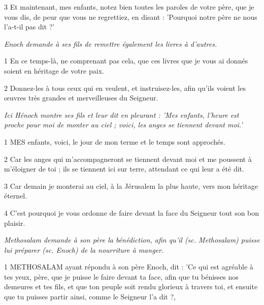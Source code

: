 \par 3 Et maintenant, mes enfants, notez bien toutes les paroles de votre père, que je vous dis, de peur que vous ne regrettiez, en disant : 'Pourquoi notre père ne nous l'a-t-il pas dit ?'


\par \textit{Enoch demande à ses fils de remettre également les livres à d'autres.}

\par 1 En ce temps-là, ne comprenant pas cela, que ces livres que je vous ai donnés soient en héritage de votre paix.

\par 2 Donnez-les à tous ceux qui en veulent, et instruisez-les, afin qu'ils voient les œuvres très grandes et merveilleuses du Seigneur.




\par \textit{Ici Hénoch montre ses fils et leur dit en pleurant : 'Mes enfants, l'heure est proche pour moi de monter au ciel ; voici, les anges se tiennent devant moi.'}

\par 1 MES enfants, voici, le jour de mon terme et le temps sont approchés.

\par 2 Car les anges qui m'accompagneront se tiennent devant moi et me poussent à m'éloigner de toi ; ils se tiennent ici sur terre, attendant ce qui leur a été dit.

\par 3 Car demain je monterai au ciel, à la Jérusalem la plus haute, vers mon héritage éternel.

\par 4 C'est pourquoi je vous ordonne de faire devant la face du Seigneur tout son bon plaisir.


\par \textit{Methosalam demande à son père la bénédiction, afin qu'il (sc. Methosalam) puisse lui préparer (sc. Enoch) de la nourriture à manger.}

\par 1 METHOSALAM ayant répondu à son père Enoch, dit : 'Ce qui est agréable à tes yeux, père, que je puisse le faire devant ta face, afin que tu bénisses nos demeures et tes fils, et que ton peuple soit rendu glorieux à travers toi, et ensuite que tu puisses partir ainsi, comme le Seigneur l'a dit ?,


